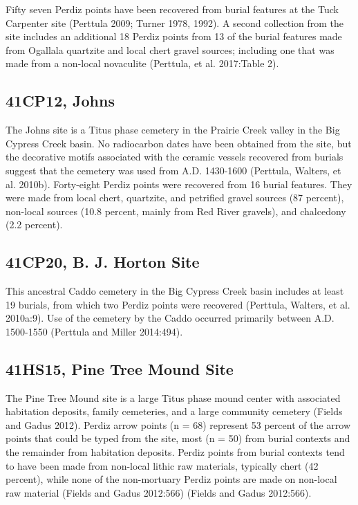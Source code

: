 \documentclass[review]{elsarticle}
\begin{document}
Fifty seven Perdiz points have been recovered from burial features at the Tuck Carpenter site (Perttula 2009; Turner 1978, 1992). A second collection from the site includes an additional 18 Perdiz points from 13 of the burial features  made from Ogallala quartzite and local chert gravel sources; including one that was made from a non-local novaculite (Perttula, et al. 2017:Table 2).

\subsection*{41CP12, Johns}

The Johns site is a Titus phase cemetery in the Prairie Creek valley in the Big Cypress Creek basin. No radiocarbon dates have been obtained from the site, but the decorative motifs associated with the ceramic vessels recovered from burials suggest that the cemetery was used from A.D. 1430-1600 (Perttula, Walters, et al. 2010b). Forty-eight Perdiz points were recovered from 16 burial features. They were made from local chert, quartzite, and petrified gravel sources (87 percent), non-local sources (10.8 percent, mainly from Red River gravels), and chalcedony (2.2 percent).

\subsection*{41CP20, B. J. Horton Site}

This ancestral Caddo cemetery in the Big Cypress Creek basin includes at least 19 burials, from which two Perdiz points were recovered (Perttula, Walters, et al. 2010a:9). Use of the cemetery by the Caddo occurred primarily between A.D. 1500-1550 (Perttula and Miller 2014:494).

\subsection*{41HS15, Pine Tree Mound Site}

The Pine Tree Mound site is a large Titus phase mound center with associated habitation deposits, family cemeteries, and a large community cemetery (Fields and Gadus 2012). Perdiz arrow points (n = 68) represent 53 percent of the arrow points that could be typed from the site, most (n = 50) from burial contexts and the remainder from habitation deposits. Perdiz points from burial contexts tend to have been made from non-local lithic raw materials, typically chert (42 percent), while none of the non-mortuary Perdiz points are made on non-local raw material (Fields and Gadus 2012:566) (Fields and Gadus 2012:566).
\end{document}
